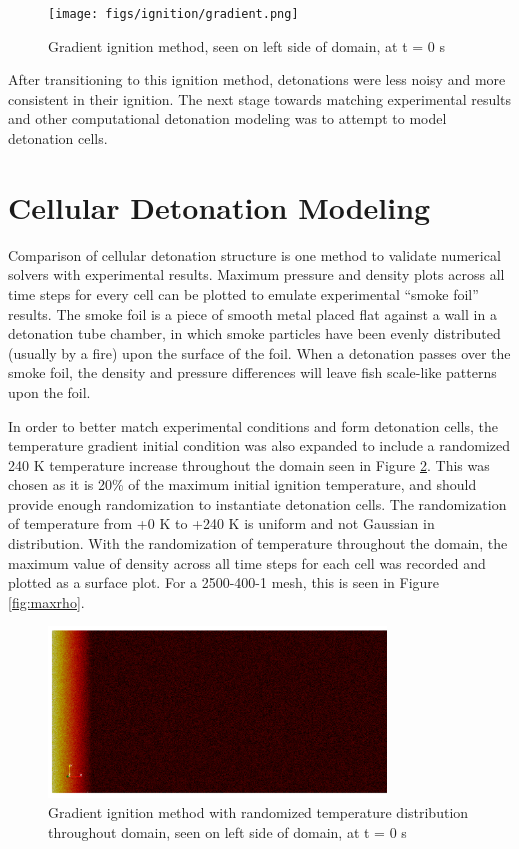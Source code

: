 \begin{figure}[t!]
\centering
\texttt{[image: figs/ignition/gradient.png]}
\caption{Gradient ignition method, seen on left side of domain, at t = 0 s}
\label{fig:gradig}
\end{figure}%


\noindent After transitioning to this ignition method, detonations were less noisy and more consistent in their ignition. The next stage towards matching experimental results and other computational detonation modeling was to attempt to model detonation cells. 

\section{Cellular Detonation Modeling}
Comparison of cellular detonation structure is one method to validate numerical solvers with experimental results. Maximum pressure and density plots across all time steps for every cell can be plotted to emulate experimental ``smoke foil'' results. The smoke foil is a piece of smooth metal placed flat against a wall in a detonation tube chamber, in which smoke particles have been evenly distributed (usually by a fire) upon the surface of the foil. When a detonation passes over the smoke foil, the density and pressure differences will leave fish scale-like patterns upon the foil. 

In order to better match experimental conditions and form detonation cells, the temperature gradient initial condition was also expanded to include a randomized 240 K temperature increase throughout the domain seen in Figure \ref{fig:gradrand}. This was chosen as it is 20\% of the maximum initial ignition temperature, and should provide enough randomization to instantiate detonation cells. The randomization of temperature from +0 K to +240 K is uniform and not Gaussian in distribution. With the randomization of temperature throughout the domain, the maximum value of density across all time steps for each cell was recorded and plotted as a surface plot. 
For a 2500-400-1 mesh, this is seen in Figure \ref{fig:maxrho}.

\begin{figure}[t!]
\centering
\includegraphics[width=0.8\textwidth]{figs/ignition/randgrad.png}
\caption{Gradient ignition method with randomized temperature distribution throughout domain, seen on left side of domain, at t = 0 s}
\label{fig:gradrand}
\end{figure}%

